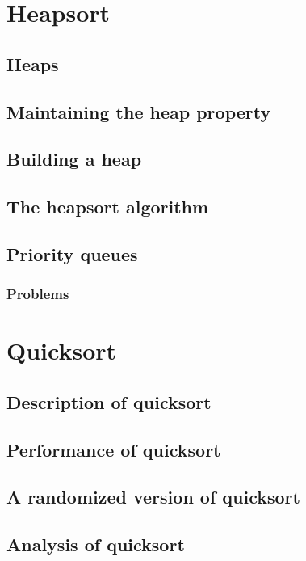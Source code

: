 \documentclass[fontsize=12pt,paper=a4,open=any]{book}
\begin{document}
\chapter{Heapsort}

\section{Heaps}

\section{Maintaining the heap property}

\section{Building a heap}

\section{The heapsort algorithm}

\section{Priority queues}

\subsection*{Problems}


\chapter{Quicksort}

\section{Description of quicksort}

\section{Performance of quicksort}

\section{A randomized version of quicksort}

\section{Analysis of quicksort}
\end{document}
